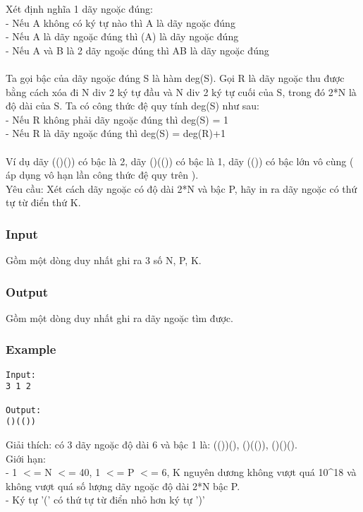 



   Xét định nghĩa 1 dãy ngoặc đúng:   
\\   - Nếu A không có ký tự nào thì A là dãy ngoặc đúng   
\\   - Nếu A là dãy ngoặc đúng thì (A) là dãy ngoặc đúng   
\\   - Nếu A và B là 2 dãy ngoặc đúng thì AB là dãy ngoặc đúng   
\\
\\   Ta gọi bậc của dãy ngoặc đúng S là hàm deg(S). Gọi R là dãy ngoặc thu được bằng cách xóa đi N div 2 ký tự đầu và N div 2 ký tự cuối của S, trong đó 2*N là độ dài của S. Ta có công thức đệ quy tính deg(S) như sau:   
\\   - Nếu R không phải dãy ngoặc đúng thì deg(S) = 1   
\\   - Nếu R là dãy ngoặc đúng thì deg(S) = deg(R)+1   
\\
\\   Ví dụ dãy (()()) có bậc là 2, dãy ()(()) có bậc là 1, dãy (()) có bậc lớn vô cùng ( áp dụng vô hạn lần công thức đệ quy trên ).   
\\   Yêu cầu: Xét cách dãy ngoặc có độ dài 2*N và bậc P, hãy in ra dãy ngoặc có thứ tự từ điển thứ K.  

\subsubsection{   Input  }

   Gồm một dòng duy nhất ghi ra 3 số N, P, K.  

\subsubsection{   Output  }

   Gồm một dòng duy nhất ghi ra dãy ngoặc tìm được.  

\subsubsection{   Example  }
\begin{verbatim}
Input:
3 1 2

Output:
()(())
\end{verbatim}

   Giải thích: có 3 dãy ngoặc độ dài 6 và bậc 1 là: (())(), ()(()), ()()().   
\\   Giới hạn:   
\\   - 1 $<$= N $<$= 40, 1 $<$= P $<$= 6, K nguyên dương không vượt quá 10\textasciicircum18 và không vượt quá số lượng dãy ngoặc độ dài 2*N bậc P.   
\\   - Ký tự '(' có thứ tự từ điển nhỏ hơn ký tự ')'  